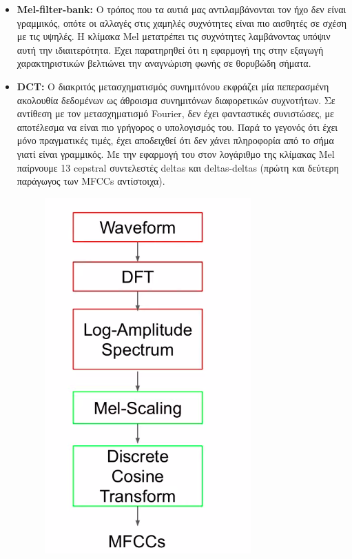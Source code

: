 \documentclass[a4paper, 12pt]{article}
\begin{document}
\begin{itemize}
            \item \textbf{Mel-filter-bank:} Ο τρόπος που τα αυτιά μας αντιλαμβάνονται τον ήχο δεν είναι γραμμικός, οπότε οι αλλαγές στις χαμηλές συχνότητες είναι πιο αισθητές σε σχέση με τις υψηλές. Η κλίμακα Mel μετατρέπει τις συχνότητες λαμβάνοντας υπόψιν αυτή την ιδιαιτερότητα. Έχει παρατηρηθεί ότι η εφαρμογή της στην εξαγωγή χαρακτηριστικών βελτιώνει την αναγνώριση φωνής σε θορυβώδη σήματα.
            
            \item \textbf{DCT:} Ο διακριτός μετασχηματισμός συνημιτόνου εκφράζει μία  πεπερασμένη ακολουθία δεδομένων ως άθροισμα συνημιτόνων διαφορετικών συχνοτήτων. Σε αντίθεση με τον μετασχηματισμό Fourier, δεν έχει φανταστικές συνιστώσες, με αποτέλεσμα να είναι πιο γρήγορος ο υπολογισμός του. Παρά το γεγονός ότι έχει μόνο πραγματικές τιμές, έχει αποδειχθεί ότι δεν χάνει πληροφορία από το σήμα γιατί είναι γραμμικός. Με την εφαρμογή του στον λογάριθμο της κλίμακας Mel παίρνουμε 13 cepstral συντελεστές deltas και deltas-deltas (πρώτη και δεύτερη παράγωγος των MFCCs αντίστοιχα).
            
        \begin{figure}[H]
            \begin{center}
                \includegraphics[width=0.5\linewidth]{mfccs.png}
            \end{center}
        \end{figure}
        
        \end{itemize}   
\end{document}
